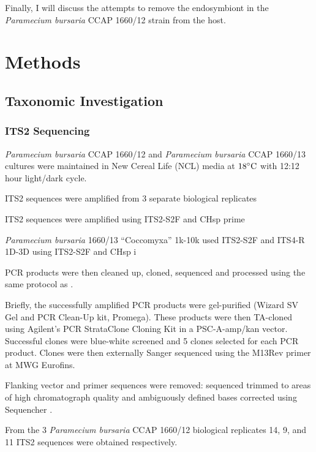 Finally, I will discuss the attempts to remove the endosymbiont in the 
\textit{Paramecium bursaria} CCAP 1660/12 strain from the host.


\section{Methods}

\subsection{Taxonomic Investigation}
    
\subsubsection{ITS2 Sequencing}

\textit{Paramecium bursaria} CCAP 1660/12 and \textit{Paramecium bursaria} CCAP 
1660/13 cultures were maintained in New Cereal Life (NCL) media
at \(18\celsius\) with 12:12 hour light/dark cycle.

ITS2 sequences were amplified from 3 separate biological replicates 




ITS2 sequences were amplified using ITS2-S2F and CHsp prime


\textit{Paramecium bursaria} 1660/13 ``Coccomyxa'' 
1k-10k used ITS2-S2F and ITS4-R
1D-3D using ITS2-S2F and CHsp
i


PCR products were then cleaned up, cloned, sequenced
and processed using the same protocol as \citep{Maguire2014a}.

Briefly, the successfully amplified PCR products were gel-purified 
(Wizard SV Gel and PCR Clean-Up kit, Promega).
These products were then TA-cloned 
using Agilent's PCR StrataClone Cloning Kit in a PSC-A-amp/kan
vector.
Successful clones were blue-white screened and 5 clones
selected for each PCR product.  
Clones were then externally Sanger sequenced using the M13Rev primer
at MWG Eurofins. 








Flanking vector and primer sequences were removed: sequenced trimmed to 
areas of high chromatograph quality and ambiguously defined bases corrected
using Sequencher \citep{Sequencher}.


From the 3 \textit{Paramecium bursaria} CCAP 1660/12 biological replicates
14, 9, and 11 ITS2 sequences were obtained respectively.





